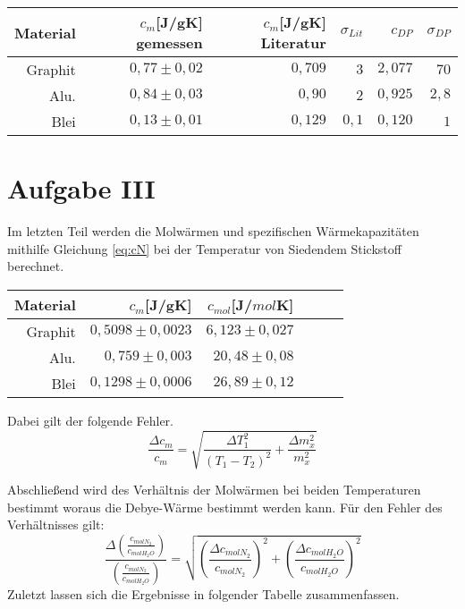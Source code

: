 \begin{table}[h!]
    \centering
    \begin{tabular}{r r r r r r}
        \toprule
        Material & $c_m$[J/gK] gemessen & $c_m$[J/gK] Literatur& $\sigma_{Lit}$ & $c_{DP}$ & $\sigma_{DP}$ \\
        \midrule
        Graphit &  $0,77 \pm 0,02 $ & $0,709$& $3$&$2,077$ &$70$\\
        Alu. & $0,84 \pm 0,03$ &$0,90$&$2$ &$0,925$ &$ 2,8 $\\
        Blei  & $0,13 \pm 0,01$ &$0,129$& $0,1$ &$0,120$&$1$\\
        
    \end{tabular}
\end{table}
\section{Aufgabe III}
Im letzten Teil werden die Molwärmen und spezifischen Wärmekapazitäten mithilfe Gleichung \ref{eq:cN} bei der
Temperatur von Siedendem Stickstoff berechnet.

\begin{table}[h!]
    \centering
    \begin{tabular}{r r r r r r}
        \toprule
        Material & $c_m$[J/gK] & $c_{mol}$[J/$mol$K] \\
        \midrule
        Graphit & $ 0,5098 \pm 0,0023 $ & $6,123 \pm 0,027$ \\
        Alu. & $0,759 \pm 0,003 $ & $20,48 \pm 0,08$ \\
        Blei & $0,1298 \pm 0,0006 $ &$ 26,89 \pm 0,12$ \\

    \end{tabular}
\end{table}
Dabei gilt der folgende Fehler.
\begin{equation}
    \frac{\Delta c_m}{c_m}=\sqrt{\frac{\Delta T_{1}^{2}}{\left(T_{1} - T_{2}\right)^{2}} + \frac{\Delta m_{x}^{2}}{m_{x}^{2}}}
\end{equation}

Abschließend wird des Verhältnis der Molwärmen bei beiden Temperaturen bestimmt woraus die Debye-Wärme bestimmt werden kann.
Für den Fehler des Verhältnisses gilt:
\begin{equation}
    \frac{\Delta (\frac{c_{molN_2}}{c_{molH_2O}})}{(\frac{c_{molN_2}}{c_{molH_2O}})} = \sqrt{(\frac{\Delta c_{molN_2}}{c_{molN_2}})^2 + (\frac{\Delta c_{molH_2O}}{c_{molH_2O}})^2}
\end{equation}
Zuletzt lassen sich die Ergebnisse in folgender Tabelle zusammenfassen.

